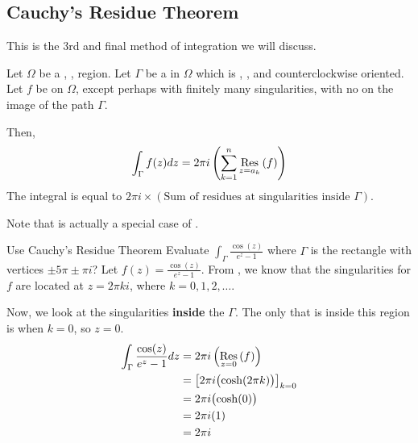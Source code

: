 \subsection{Cauchy's Residue Theorem}\label{subsec:Cauchys_Residue_Theorem}
This is the 3rd and final method of integration we will discuss.

\begin{theorem}\label{thm:Cauchys_Residue_Theorem}
  Let $\Omega$ be a , ,  region.
  Let $\Gamma$ be a  in $\Omega$ which is , , and counterclockwise oriented.
  Let $f$ be  on $\Omega$, except perhaps  with finitely many singularities, with no  on the image of the path $\Gamma$.

  Then,
  \begin{equation}\label{eq:Cauchys_Residue_Theorem}
    \int_{\Gamma} f(z) dz = 2\pi i \left( \sum_{k=1}^{n} \Residue{f}{z=a_{k}} \right)
  \end{equation}
  The integral is equal to $2\pi i \times (\text{Sum of residues at singularities inside $\Gamma$})$.
\end{theorem}

\begin{remark*}
  Note that  is actually a special case of .
\end{remark*}

\begin{example}{Use Cauchy's Residue Theorem}
  Evaluate $\int_{\Gamma} \frac{\cos(z)}{e^{z} -1}$ where $\Gamma$ is the rectangle with vertices $\pm 5\pi \pm \pi i$?
  \tcblower{}
  Let $f(z) = \frac{\cos(z)}{e^{z} -1}$.
  From , we know that the singularities for $f$ are located at $z = 2\pi k i$, where $k = 0, 1, 2, \ldots$.

  Now, we look at the singularities \textbf{inside} the   $\Gamma$.
  The only  that is inside this region is when $k=0$, so $z=0$.
  \begin{align*}
    \int_{\Gamma} \frac{\cos(z)}{e^{z} - 1} dz &= 2\pi i \left( \Residue{f}{z=0} \right) \\
                                               &= {\left[ 2\pi i \bigl( \cosh(2\pi k) \bigr) \right]}_{k=0} \\
                                               &= 2\pi i \bigl( \cosh(0) \bigr) \\
                                               &= 2\pi i (1) \\
                                               &= 2\pi i
  \end{align*}
\end{example}


